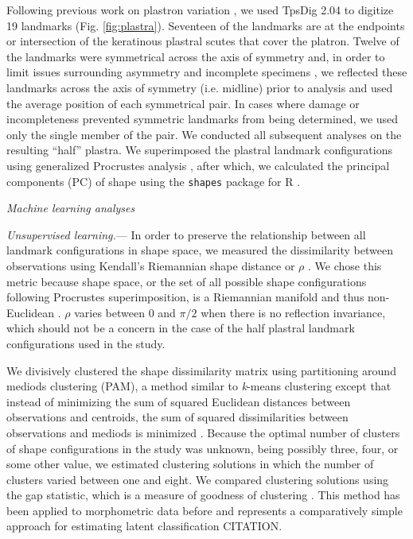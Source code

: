 \documentclass[12pt,letterpaper]{article}
\renewcommand{\subsection}[1]{%
\bigskip
\begin{center}
\begin{large}
\normalfont\itshape #1
\end{large}
\end{center}}
\renewcommand{\subsubsection}[1]{%
\vspace{2ex}
\noindent
\textit{#1.}---}
\begin{document}
Following previous work on plastron variation \citep{Angielczyk2007,Angielczyk2011,Angielczyk2013a}, we used TpsDig 2.04 \citep{Rohlf2005} to digitize 19 landmarks (Fig. \ref{fig:plastra}). Seventeen of the landmarks are at the endpoints or intersection of the keratinous plastral scutes that cover the platron. Twelve of the landmarks were symmetrical across the axis of symmetry and, in order to limit issues surrounding asymmetry and incomplete specimens \citep{Klingenberg2002}, we reflected these landmarks across the axis of symmetry (i.e. midline) prior to analysis and used the average position of each symmetrical pair. In cases where damage or incompleteness prevented symmetric landmarks from being determined, we used only the single member of the pair. We conducted all subsequent analyses on the resulting ``half'' plastra. We superimposed the plastral landmark configurations using generalized Procrustes analysis \citep{Dryden1998a}, after which, we calculated the principal components (PC) of shape using the \texttt{shapes} package for R \citep{2013,Dryden2013}.


\subsection{Machine learning analyses}
\subsubsection{Unsupervised learning}
In order to preserve the relationship between all landmark configurations in shape space, we measured the dissimilarity between observations using Kendall's Riemannian shape distance or \(\rho\) \citep{Kendall1984a,Dryden1998a}. We chose this metric because shape space, or the set of all possible shape configurations following Procrustes superimposition, is a Riemannian manifold and thus non-Euclidean \citep{Dryden1998a}. \(\rho\) varies between 0 and \(\pi / 2\) when there is no reflection invariance, which should not be a concern in the case of the half plastral landmark configurations used in the study.

We divisively clustered the shape dissimilarity matrix using partitioning around mediods clustering (PAM), a method similar to \textit{k}-means clustering except that instead of minimizing the sum of squared Euclidean distances between observations and centroids, the sum of squared dissimilarities between observations and mediods is minimized \citep{Kaufman1990}. Because the optimal number of clusters of shape configurations in the study was unknown, being possibly three, four, or some other value, we estimated clustering solutions in which the number of clusters varied between one and eight. We compared clustering solutions using the gap statistic, which is a measure of goodness of clustering \citep{Tibshirani2001a}. This method has been applied to morphometric data before and represents a comparatively simple approach for estimating latent classification CITATION.
\end{document}
